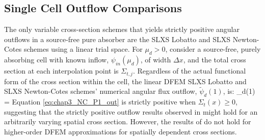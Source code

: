\subsection{Single Cell Outflow Comparisons}
%
The only variable cross-section schemes that yields strictly positive angular outflows in a source-free pure absorber are the SLXS Lobatto and SLXS Newton-Cotes schemes using a linear trial space.
For $\mu_d > 0$, consider a source-free, purely absorbing cell with known inflow, $\psi_{in}(\mu_d)$, of width $\Delta x$, and the total cross section at each interpolation point is $\Sigma_{t,j}$.
Regardless of the actual functional form of the cross section within the cell, the linear DFEM SLXS Lobatto and SLXS Newton-Cotes schemes'
numerical angular flux outflow, $\widetilde{\psi}_d(1)$, is:
\benum
\label{eq:chap3_NC_P1_out}
\widetilde{\psi}_d(1) =  \pep
\eenum
Equation \ref{eq:chap3_NC_P1_out} is strictly positive when $\Sigma_t(x) \geq 0$, suggesting that the strictly positive outflow results observed in \cite{part_1_paper} might hold for an arbitrarily varying spatial cross section.
However, the results of \cite{part_1_paper} do not hold for higher-order DFEM approximations for spatially dependent cross sections.  

